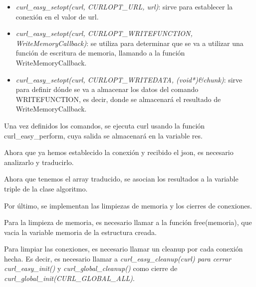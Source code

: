 \begin{itemize}
\item \textit{curl\_easy\_setopt(curl, CURLOPT\_URL, url)}: sirve para establecer la conexión en el valor de url.
\item \textit{curl\_easy\_setopt(curl, CURLOPT\_WRITEFUNCTION, WriteMemoryCallback)}: se utiliza para determinar que se va a utilizar una función de escritura de memoria, llamando a la función WriteMemoryCallback.
\item \textit{curl\_easy\_setopt(curl, CURLOPT\_WRITEDATA, (void*)\&chunk)}: sirve para definir dónde se va a almacenar los datos del comando WRITEFUNCTION, es decir, donde se almacenará el resultado de WriteMemoryCallback.
\end{itemize}

Una vez definidos los comandos, se ejecuta curl usando la función curl\_easy\_perform, cuya salida se almacenará en la variable res.

Ahora que ya hemos establecido la conexión y recibido el json, es necesario analizarlo y traducirlo.

Ahora que tenemos el array traducido, se asocian los resultados a la variable triple de la clase algoritmo.

Por último, se implementan las limpiezas de memoria y los cierres de conexiones.

Para la limpieza de memoria, es necesario llamar a la función free(memoria), que vacia la variable memoria de la estructura creada.

Para limpiar las conexiones, es necesario llamar un cleanup por cada conexión hecha. Es decir, es necesario llamar a \textit{curl\_easy\_cleanup(curl) para cerrar curl\_easy\_init()} y \textit{curl\_global\_cleanup()} como cierre de \textit{curl\_global\_init(CURL\_GLOBAL\_ALL)}.

